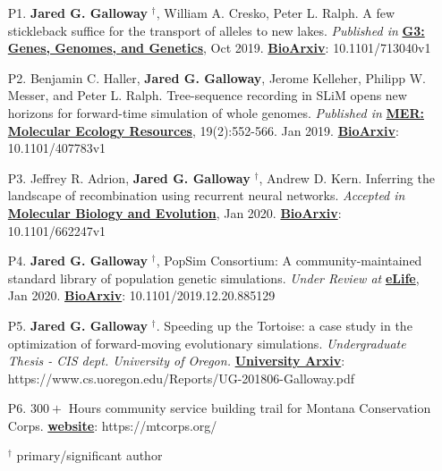 \documentclass[letterpaper,11pt]{article}
\let\oldhref\href
\renewcommand{\href}[2]{\oldhref{#1}{\bfseries#2}}
\begin{document}
\begin{enumerate}
\item [P1.] \textbf{Jared G. Galloway} $^{\dagger}$, William A. Cresko, Peter L. Ralph. A few stickleback suffice for the transport
of alleles to new lakes. \textit{Published in} 
\href{https://www.g3journal.org/content/early/2019/12/04/g3.119.400564}{G3: Genes, Genomes, and Genetics}, Oct 2019.
\href{https://www.biorxiv.org/content/10.1101/713040v1.abstract}{BioArxiv}: 10.1101/713040v1

\item [P2.] Benjamin C. Haller, \textbf{Jared G. Galloway}, Jerome Kelleher, Philipp W. Messer, and Peter L. Ralph.
Tree-sequence recording in SLiM opens new horizons for forward-time simulation of whole genomes. 
\textit{Published in} 
\href{https://onlinelibrary.wiley.com/doi/abs/10.1111/1755-0998.12968}{MER: Molecular Ecology Resources}, 19(2):552-566. Jan 2019. 
\href{https://www.biorxiv.org/content/10.1101/407783v1}{BioArxiv}: 10.1101/407783v1 

\item [P3.] Jeffrey R. Adrion, \textbf{Jared G. Galloway} $^{\dagger}$, Andrew D. Kern. Inferring the landscape of recombination 
using recurrent neural networks. \textit{Accepted in} 
\href{https://academic.oup.com/mbe}{Molecular Biology and Evolution}, Jan 2020.
\href{https://www.biorxiv.org/content/10.1101/662247v1.abstract}{BioArxiv}: 10.1101/662247v1

\item [P4.] \textbf{Jared G. Galloway} $^{\dagger}$, PopSim Consortium:
A community-maintained standard library of population genetic simulations.
\textit{Under Review at}
\href{https://elifesciences.org/?gclid=CjwKCAiA6vXwBRBKEiwAYE7iS0LA_KboY5NjoOVJAMq06BEUSsqPFV9R1GA1NUUIgYw2XgTiv1fUxhoC3xYQAvD_BwE}{eLife}, Jan 2020.
\href{https://www.biorxiv.org/content/10.1101/2019.12.20.885129v1}{BioArxiv}: 10.1101/2019.12.20.885129 

\item [P5.] \textbf{Jared G. Galloway} $^{\dagger}$. Speeding up the Tortoise: a case study in the optimization of forward-moving
evolutionary simulations. \textit{Undergraduate Thesis - CIS dept. University of Oregon.} 
\href{https://www.cs.uoregon.edu/Reports/UG-201806-Galloway.pdf}{University Arxiv}: https://www.cs.uoregon.edu/Reports/UG-201806-Galloway.pdf

\item [P6.] $300+$ Hours community service building trail for Montana Conservation Corps. 
\href{https://mtcorps.org/}{website}: https://mtcorps.org/

\begin{center}
$^{\dagger}$ primary/significant author
\end{center}

\end{enumerate}
\end{document}
